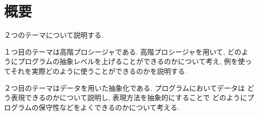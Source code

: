 
%
\author{Daniel Perez}
%

\maketitle
%
\section*{概要}
２つのテーマについて説明する.

１つ目のテーマは高階プロシージャである. 高階プロシージャを用いて,
どのようにプログラムの抽象レベルを上げることができるのかについて考え,
例を使ってそれを実際どのように使うことができるのかを説明する.

２つ目のテーマはデータを用いた抽象化である. プログラムにおいてデータは
どう表現できるのかについて説明し, 表現方法を抽象的にすることで
どのようにプログラムの保守性などをよくできるのかについて考える.
%

%

%

